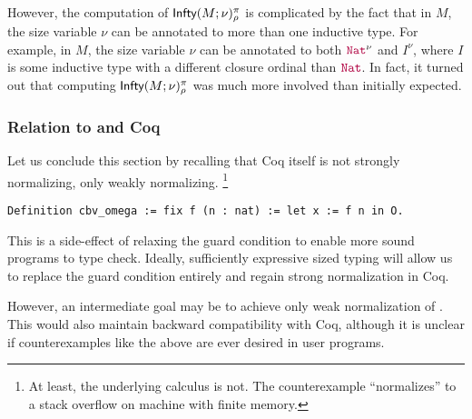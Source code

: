 However, the computation of $\textsf{Infty}(M;\nu)_\rho^\pi$ is complicated by
the fact that in $M$, the size variable $\nu$ can be annotated to more
than one inductive type.
%
For example, in $M$, the size variable $\nu$ can be annotated to both
$\Nat^\nu$ and $I^\nu$, where $I$ is some inductive type with a
different closure ordinal than $\Nat$.
%
In fact, it turned out that computing $\textsf{Infty}(M;\nu)_\rho^\pi$ was
much more involved than initially expected.

\subsubsection{Relation to \lang and Coq}
%
Let us conclude this section by recalling that Coq itself is not
strongly normalizing, only weakly normalizing.
%
\footnote{At least, the
  underlying calculus is not. The counterexample ``normalizes'' to a
  stack overflow on machine with finite memory.}

\begin{verbatim}
Definition cbv_omega := fix f (n : nat) := let x := f n in O.
\end{verbatim}

This is a side-effect of relaxing the guard condition to enable more
sound programs to type check.
%
Ideally, sufficiently expressive sized typing will allow us to replace
the guard condition entirely and regain strong normalization in Coq.

However, an intermediate goal may be to achieve only weak
normalization of \lang.
%
This would also maintain backward compatibility with Coq, although it
is unclear if counterexamples like the above are ever desired in user
programs.

